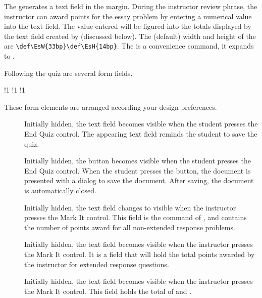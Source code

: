 \documentclass{article}
\begin{document}
\eVerb The  generates a text field in the margin. During the
instructor review phrase, the instructor can award points for the essay
problem by entering a numerical value into the text field. The value entered
will be figured into the totals displayed by the text field created by
 (discussed below). The (default) width and height of the 
are \verb~\def\EsW{33bp}\def\EsH{14bp}~. The  is a convenience command,
it expands to \allowbreak{}.



\newtopic\noindent
Following the quiz are several form fields. %
\bVerb{}%
\setlength{\eflength}{\bxSize}%
\def\1{\rlap{\hskip\eflength\textsf{wd:\,}\cs{PTFW}\textsf{, ht:\,}\cs{DefaultHeightOfWidget}}}%
\begin{dCmd}[commandchars=!()]{\bxSize}
!1
!1
!1
\end{dCmd}
\eVerb These form elements are arranged according your design preferences.
\begin{description}
\item[] Initially hidden, the text field becomes
    visible when the student presses the \textsf{End Quiz} control. The
    appearing text field reminds the student to save the quiz.

\item[] Initially hidden, the button becomes visible
    when the student presses the \textsf{End Quiz} control. When the
    student presses the button, the document is presented with a dialog to
    save the document. After saving, the document is automatically closed.

\item[] Initially hidden, the text field changes to visible
    when the instructor presses the \textsf{Mark It} control. This field
    is the  command of , and contains the number
    of points award for all non-extended response problems.

\item[] Initially hidden, the text field becomes visible
    when the instructor presses the \textsf{Mark It} control. It is a field
    that will hold the total points awarded by the instructor for extended response
    questions.

\item[] Initially hidden, the text field becomes visible
    when the instructor presses the \textsf{Mark It} control. This field holds
    the total of  and .
\end{description}
\end{document}
